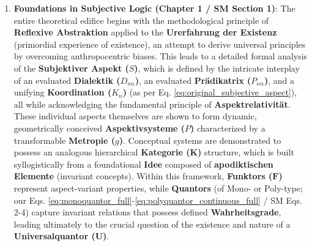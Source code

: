 \documentclass[12pt]{article}
\newcommand{\kategorie}{\bm{K}}
\newcommand{\universalquantor}{\bm{U}}
\newcommand{\aspektivsystem}{P}
\newcommand{\funktor}{\bm{F}}
\newcommand{\subjektiveraspekt}{S}
\newcommand{\pradikatrix}{P}
\newcommand{\dialektik}{D}
\newcommand{\koordination}{K}
\begin{document}
\begin{enumerate}
    \item \textbf{Foundations in Subjective Logic (Chapter 1 / SM Section 1)}: The entire theoretical edifice begins with the methodological principle of \textbf{Reflexive Abstraktion} applied to the \textbf{Urerfahrung der Existenz} (primordial experience of existence), an attempt to derive universal principles by overcoming anthropocentric biases. This leads to a detailed formal analysis of the \textbf{Subjektiver Aspekt (\(\subjektiveraspekt\))}, which is defined by the intricate interplay of an evaluated \textbf{Dialektik (\(\dialektik_{nn}\))}, an evaluated \textbf{Prädikatrix (\(\pradikatrix_{nn}\))}, and a unifying \textbf{Koordination (\(\koordination_n\))} (as per Eq. \eqref{eq:original_subjective_aspect}), all while acknowledging the fundamental principle of \textbf{Aspektrelativität}. These individual aspects themselves are shown to form dynamic, geometrically conceived \textbf{Aspektivsysteme (\(\aspektivsystem\))} characterized by a transformable \textbf{Metropie (\(g\))}. Conceptual systems are demonstrated to possess an analogous hierarchical \textbf{Kategorie (\(\kategorie\))} structure, which is built syllogistically from a foundational \textbf{Idee} composed of \textbf{apodiktischen Elemente} (invariant concepts). Within this framework, \textbf{Funktors (\(\funktor\))} represent aspect-variant properties, while \textbf{Quantors} (of Mono- or Poly-type; our Eqs. \eqref{eq:monoquantor_full}-\eqref{eq:polyquantor_continuous_full} / SM Eqs. 2-4) capture invariant relations that possess defined \textbf{Wahrheitsgrade}, leading ultimately to the crucial question of the existence and nature of a \textbf{Universalquantor (\(\universalquantor\))}.


\end{enumerate}
\end{document}
